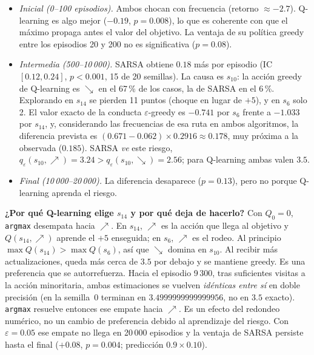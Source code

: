 \documentclass[11pt,a4paper]{article}
\newcommand{\UR}{{\nearrow}}
\newcommand{\DR}{{\searrow}}
\newcommand{\qe}{q_\varepsilon}
\begin{document}
\begin{itemize}\itemsep0pt

\item \emph{Inicial (0--100 episodios).} Ambos chocan con frecuencia (retorno $\approx-2.7$). Q-learning es algo mejor ($-0.19$, $p=0.008$), lo que es coherente con que el máximo propaga antes el valor del objetivo. La ventaja de su política greedy entre los episodios 20 y 200 no es significativa ($p=0.08$).

\item \emph{Intermedia (500--10\,000).} SARSA obtiene $0.18$ más por episodio (IC $[0.12,0.24]$, $p<0.001$, 15 de 20 semillas). La causa es $s_{10}$: la acción greedy de Q-learning es $\DR$ en el 67\,\% de los casos, la de SARSA en el 6\,\%. Explorando en $s_{14}$ se pierden 11 puntos (choque en lugar de $+5$), y en $s_6$ solo 2. El valor exacto de la conducta $\varepsilon$-greedy es $-0.741$ por $s_6$ frente a $-1.033$ por $s_{14}$, y, considerando las frecuencias de esa ruta en ambos algoritmos, la diferencia prevista es $(0.671-0.062)\times0.2916\approx0.178$, muy próxima a la observada ($0.185$). SARSA \emph{ve} este riesgo, $\qe(s_{10},\UR)=3.24>\qe(s_{10},\DR)=2.56$; para Q-learning ambas valen $3.5$.

\item \emph{Final (10\,000--20\,000).} La diferencia desaparece ($p=0.13$), pero no porque Q-learning aprenda el riesgo.

\end{itemize}



\textbf{¿Por qué Q-learning elige $s_{14}$ y por qué deja de hacerlo?} Con $Q_0=0$, \texttt{argmax} desempata hacia $\UR$. En $s_{14}$, $\UR$ es la acción que llega al objetivo y $Q(s_{14},\UR)$ aprende el $+5$ enseguida; en $s_6$, $\UR$ es el rodeo. Al principio $\max Q(s_{14})>\max Q(s_6)$, así que $\DR$ domina en $s_{10}$. Al recibir más actualizaciones, queda más cerca de $3.5$ por debajo y se mantiene greedy. Es una preferencia que se autorrefuerza. Hacia el episodio 9\,300, tras suficientes visitas a la acción minoritaria, ambas estimaciones se vuelven \emph{idénticas entre sí} en doble precisión (en la semilla~0 terminan en $3.4999999999999956$, no en $3.5$ exacto). \texttt{argmax} resuelve entonces ese empate hacia $\UR$. Es un efecto del redondeo numérico, no un cambio de preferencia debido al aprendizaje del riesgo. Con $\varepsilon=0.05$ ese empate no llega en 20\,000 episodios y la ventaja de SARSA persiste hasta el final ($+0.08$, $p=0.004$; predicción $0.9\times0.10$).
\end{document}
